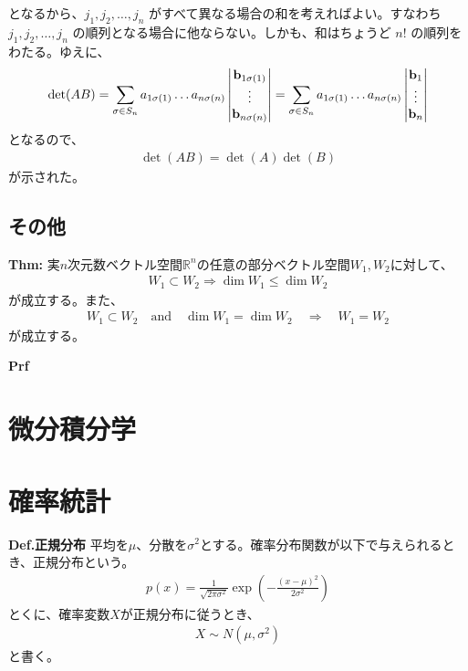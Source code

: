 \documentclass[a4paper,11pt]{jsarticle}
\numberwithin{equation}{section}
\begin{document}
となるから、$j_1, j_2, \dots, j_n$ がすべて異なる場合の和を考えればよい。すなわち $j_1, j_2, \dots, j_n$ の順列となる場合に他ならない。しかも、和はちょうど $n!$ の順列をわたる。ゆえに、
\begin{align}
  \det(AB) = \sum_{\sigma \in S_n} a_{1\sigma(1)} \dots a_{n\sigma(n)} 
  \begin{vmatrix}
      \vb{b}_{1\sigma(1)} \\
      \vdots \\
      \vb{b}_{n\sigma(n)}
  \end{vmatrix}
  = \sum_{\sigma \in S_n} a_{1\sigma(1)} \dots a_{n\sigma(n)} 
  \begin{vmatrix}
      \vb{b}_{1} \\
      \vdots \\
      \vb{b}_{n}
  \end{vmatrix}
\end{align}
となるので、
\begin{align}
  \det(AB) = \det(A) \det(B)
\end{align}
が示された。\hfill\qedsymbol\\


\subsection{その他}
\begin{itembox}[l]{\textbf{Thm:}}
  実$n$次元数ベクトル空間$\mathbb{R}^n$の任意の部分ベクトル空間$W_1, W_2$に対して、
  \begin{align}
    W_1 \subset W_2 \Rightarrow \dim W_1 \leq \dim W_2
  \end{align}
  が成立する。また、
  \begin{align}
    W_1 \subset W_2 \quad \text{and} \quad \dim W_1 = \dim W_2 \quad \Rightarrow \quad W_1 = W_2
  \end{align}
  が成立する。
\end{itembox}
\textbf{Prf}\\

\section{微分積分学}


\section{確率統計}
\begin{itembox}[l]{\textbf{Def.正規分布}}
  平均を$\mu$、分散を$\sigma^2$とする。確率分布関数が以下で与えられるとき、正規分布という。
  \begin{align}
    p(x) = \frac{1}{\sqrt{2\pi \sigma^2}} \exp\left(-\frac{(x-\mu)^2}{2\sigma^2}\right)
  \end{align}
  とくに、確率変数$X$が正規分布に従うとき、
  \begin{align}
    X \sim N(\mu,\sigma^2)
  \end{align}
  と書く。
\end{itembox}
\end{document}
